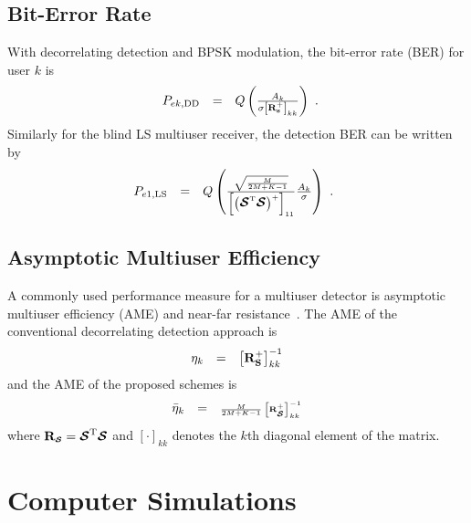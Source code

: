 \documentclass[conference]{IEEEtran}
\newcommand{\bs}{{\bf s}}
\newcommand{\bS}{{\bf S}}
\newcommand{\bR}{{\bf R}}
\newcommand{\bcS}{{\mbox {\boldmath ${\cal S}$}}}
\begin{document}
\subsection{Bit-Error Rate}
With decorrelating detection and BPSK modulation, the bit-error
rate (BER) for user $k$ is
\begin{equation}
\begin{array}{rcl}
P_{ek,\rm\small DD} &=&
Q\left(\frac{A_{k}}{\sigma\left[\bR_{\bs}^{+}\right]_{kk}}\right)
\end{array}.\label{BER_DD}
\end{equation}
\noindent Similarly for the blind LS multiuser receiver, the
detection BER can be written by
\begin{equation}\hspace{-0.07in}
\begin{array}{rcl}
P_{e1,\rm\small LS} &=&
Q\left(\frac{\sqrt{\frac{M}{2M+K-1}}}{\left[\left(\bcS^{\rm
T}\bcS\right)^{+}\right]_{11}}\frac{A_k}{\sigma}\right)\ .
\end{array}\label{BER_LS}
\end{equation}

\subsection{Asymptotic Multiuser Efficiency}
A commonly used performance measure for a
multiuser detector is asymptotic multiuser efficiency (AME) and
near-far resistance~\cite{Verd98}. The AME of the conventional
decorrelating detection approach is
\begin{equation}
\begin{array}{rcl}
{\eta}_k&=&\left[\bR_{\bS}^{+}\right]_{kk}^{-1}
\end{array}
\end{equation}
\noindent and the AME of the proposed schemes is
\begin{equation}
\begin{array}{rcl}
\bar{\eta}_k&=&{\frac{M}{2M+K-1}}\left[\bR_{\tiny\bcS}^{+}\right]_{kk}^{-1}
\end{array}
\end{equation}
\noindent where $\bR_{\tiny\bcS}=\bcS^{\rm T}\bcS$ and
$\left[\cdot\right]_{kk}$ denotes the $k$th diagonal element of
the matrix.

\section{Computer Simulations}
\end{document}
